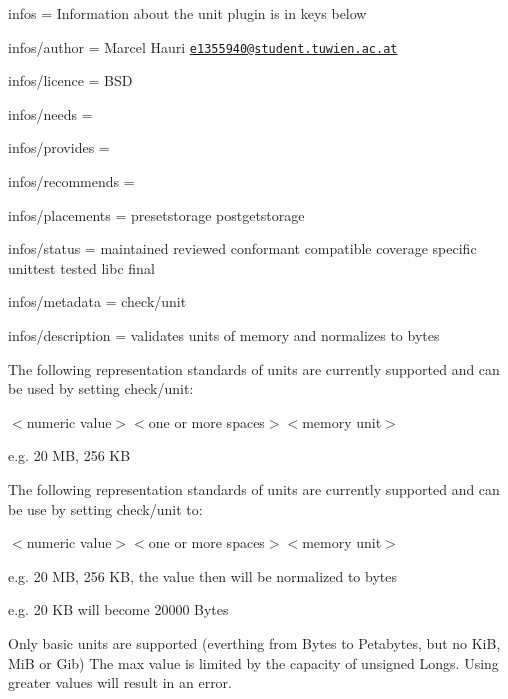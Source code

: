 
\begin{DoxyItemize}
\item infos = Information about the unit plugin is in keys below
\item infos/author = Marcel Hauri \href{mailto:e1355940@student.tuwien.ac.at}{\tt e1355940@student.\+tuwien.\+ac.\+at}
\item infos/licence = B\+SD
\item infos/needs =
\item infos/provides =
\item infos/recommends =
\item infos/placements = presetstorage postgetstorage
\item infos/status = maintained reviewed conformant compatible coverage specific unittest tested libc final
\item infos/metadata = check/unit
\item infos/description = validates units of memory and normalizes to bytes
\end{DoxyItemize}

The following representation standards of units are currently supported and can be used by setting {\ttfamily check/unit}\+:


\begin{DoxyItemize}
\item {\ttfamily $<$numeric value$>$$<$one or more spaces$>$$<$memory unit$>$}

e.\+g. 20 MB, 256 KB
\end{DoxyItemize}

The following representation standards of units are currently supported and can be use by setting {\ttfamily check/unit} to\+:


\begin{DoxyItemize}
\item {\ttfamily $<$numeric value$>$$<$one or more spaces$>$$<$memory unit$>$}

e.\+g. 20 MB, 256 KB, the value then will be normalized to bytes
\end{DoxyItemize}

e.\+g. 20 KB will become 20000 Bytes

Only basic units are supported (everthing from Bytes to Petabytes, but no KiB, MiB or Gib) The max value is limited by the capacity of unsigned Longs. Using greater values will result in an error. 